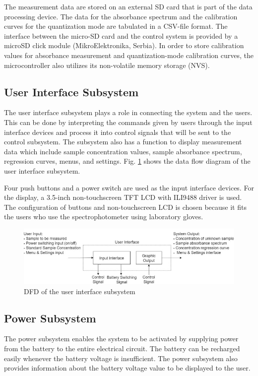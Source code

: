 \documentclass[conference]{IEEEtran}
\begin{document}
The measurement data are stored on an external SD card that is part of the data processing device.
The data for the absorbance spectrum and the calibration curves for the quantization mode are tabulated in a CSV-file format.
The interface between the micro-SD card and the control system is provided by a microSD click module (MikroElektronika, Serbia).
In order to store calibration values for absorbance measurement and quantization-mode calibration curves, the microcontroller also utilizes its non-volatile memory storage (NVS).

\subsection{User Interface Subsystem}
The user interface subsystem plays a role in connecting the system and the users.
This can be done by interpreting the commands given by users through the input interface devices and process it into control signals that will be sent to the control subsystem.
The subsystem also has a function to display measurement data which include sample concentration values, sample absorbance spectrum, regression curves, menus, and settings.
Fig. \ref{ui-dfd} shows the data flow diagram of the user interface subsystem.

Four push buttons and a power switch are used as the input interface devices.
For the display, a 3.5-inch non-touchscreen TFT LCD with ILI9488 driver is used.
The configuration of buttons and non-touchscreen LCD is chosen because it fits the users who use the spectrophotometer using laboratory gloves.

    \begin{figure}[htbp]
    \centerline{\includegraphics[scale=0.43]{ui-dfd.png}}
    \caption{DFD of the user interface subsystem}
    \label{ui-dfd}
    \end{figure}


\subsection{Power Subsystem}
The power subsystem enables the system to be activated by supplying power from the battery to the entire electrical circuit. The battery can be recharged easily whenever the battery voltage is insufficient. The power subsystem also provides information about the battery voltage value to be displayed to the user. 
\end{document}
